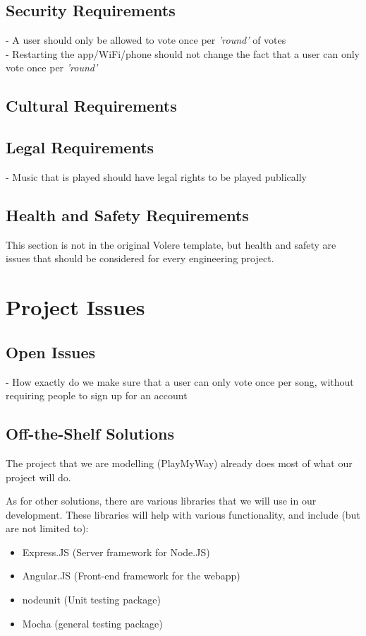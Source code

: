 \documentclass[12pt, titlepage]{article}
\begin{document}
\subsection{Security Requirements}

- A user should only be allowed to vote once per \textit{'round'} of votes \\
- Restarting the app/WiFi/phone should not change the fact that a user can only
  vote once per \textit{'round'} \\

\subsection{Cultural Requirements}

\subsection{Legal Requirements}
- Music that is played should have legal rights to be played publically \\
\subsection{Health and Safety Requirements}

This section is not in the original Volere template, but health and safety are
issues that should be considered for every engineering project.

\section{Project Issues}

\subsection{Open Issues}

- How exactly do we make sure that a user can only vote once per song, without
  requiring people to sign up for an account \\

\subsection{Off-the-Shelf Solutions}

The project that we are modelling (PlayMyWay) already does most of what our
project will do.

As for other solutions, there are various libraries that we will use in our
development. These libraries will help with various functionality, and include
(but are not limited to):
\begin{itemize}
\item Express.JS (Server framework for Node.JS)
\item Angular.JS (Front-end framework for the webapp)
\item nodeunit (Unit testing package)
\item Mocha (general testing package)
\end{itemize}
\end{document}
